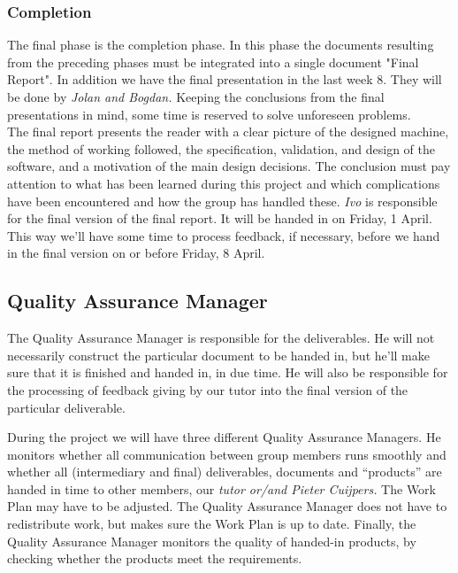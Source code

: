 \subsubsection{Completion}
The final phase is the completion phase. In this phase the documents resulting from the preceding phases must be integrated into a single document "Final Report". In addition we have the final presentation in the last week 8. They will be done by \emph{Jolan and Bogdan.} Keeping the conclusions from the final presentations in mind, some time is reserved to solve unforeseen problems.\\
The final report presents the reader with a clear picture of the designed machine, the method of working followed, the specification, validation, and design of the software, and a motivation of the main design decisions. The conclusion must pay attention to what has been learned during this project and which complications have been encountered and how the group has handled these. \emph{Ivo} is responsible for the final version of the final report. It will be handed in on Friday, 1 April. This way we'll have some time to process feedback, if necessary, before we hand in the final version on or before Friday, 8 April.

\subsection{Quality Assurance Manager}
The Quality Assurance Manager is responsible for the deliverables. He will not necessarily construct the particular document to be handed in, but he'll make sure that it is finished and handed in, in due time. He will also be responsible for the processing of feedback giving by our tutor into the final version of the particular deliverable.

During the project we will have three different Quality Assurance Managers. He monitors whether all communication between group members runs smoothly and whether all (intermediary and final) deliverables, documents and ``products'' are handed in time to other members, our \emph{tutor or/and Pieter Cuijpers.} The Work Plan may have to be adjusted. The Quality Assurance Manager does not have to redistribute work, but makes sure the Work Plan is up to date. Finally, the Quality Assurance Manager monitors the quality of handed-in products, by checking whether the products meet the requirements. \newpage
 
